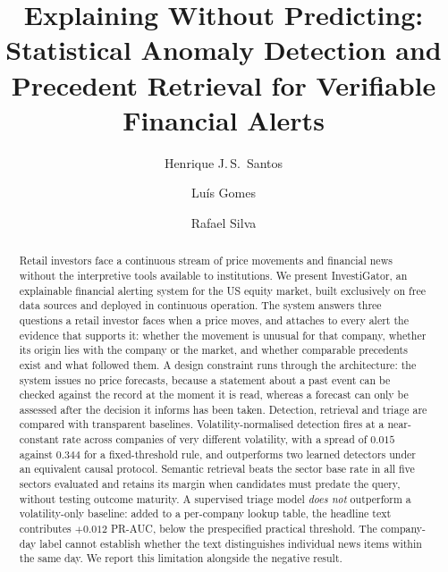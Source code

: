 \documentclass[runningheads]{llncs}
\begin{document}
\title{Explaining Without Predicting: Statistical Anomaly Detection and Precedent
Retrieval for Verifiable Financial Alerts}


\author{Henrique J.\,S.\ Santos \and
Lu\'is Gomes \and
Rafael Silva}



\maketitle

\begin{abstract}
Retail investors face a continuous stream of price movements and financial news without
the interpretive tools available to institutions. We present InvestiGator, an
explainable financial alerting system for the US equity market, built exclusively on free
data sources and deployed in continuous operation. The system answers three questions a
retail investor faces when a price moves, and attaches to every alert the evidence that
supports it: whether the movement is unusual for that company, whether its origin lies
with the company or the market, and whether comparable precedents exist and what followed
them. A design constraint runs through the architecture: the system issues no price
forecasts, because a statement about a past event can be checked against the record at the
moment it is read, whereas a forecast can only be assessed after the decision it informs
has been taken. Detection, retrieval and triage are compared with transparent baselines.
Volatility-normalised detection fires at a near-constant rate across companies of
very different volatility, with a spread of $0.015$ against $0.344$ for a fixed-threshold
rule, and outperforms two learned detectors under an equivalent causal protocol. Semantic
retrieval beats the sector base rate in all five sectors evaluated and retains its margin
when candidates must predate the query, without testing outcome maturity. A supervised triage model
\emph{does not} outperform a volatility-only baseline: added to a per-company lookup table,
the headline text contributes $+0.012$ PR-AUC, below the prespecified practical threshold.
The company-day label cannot establish whether the text distinguishes individual news
items within the same day. We report this limitation alongside the negative result.

\end{abstract}
\end{document}
